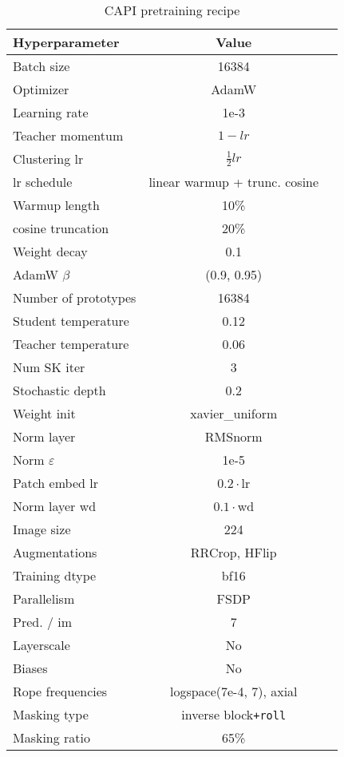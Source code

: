 \begin{table}
\centering
    \begin{tabular}{lcc}
      \toprule
      Hyperparameter & Value \\
      \midrule
      Batch size & 16384 \\
      Optimizer & AdamW \\
      Learning rate & 1e-3 \\
      Teacher momentum & $1-lr$ \\
      Clustering lr & $\frac{1}{2}lr$ \\
      lr schedule & linear warmup + trunc. cosine\\
      Warmup length & 10\% \\
      cosine truncation & 20\% \\
      Weight decay & 0.1 \\
      AdamW $\beta$ & (0.9, 0.95) \\
      Number of prototypes & 16384 \\
      Student temperature & 0.12 \\
      Teacher temperature & 0.06 \\
      Num SK iter & 3 \\
      Stochastic depth & 0.2 \\
      Weight init & xavier\_uniform \\
      Norm layer & RMSnorm \\
      Norm $\varepsilon$ & 1e-5 \\
      Patch embed lr & $0.2\cdot{}$lr \\
      Norm layer wd & $0.1\cdot{}$wd \\
      Image size & 224 \\
      Augmentations & RRCrop, HFlip \\
      Training dtype & bf16 \\
      Parallelism & FSDP \\
      Pred. / im & 7 \\
      Layerscale & No \\
      Biases & No \\
      Rope frequencies & logspace(7e-4, 7), axial \\
      Masking type & inverse block\texttt{+roll} \\
      Masking ratio & 65\% \\
      \bottomrule
    \end{tabular}
    \caption{
      CAPI pretraining recipe
    }
    \label{tab:pretraining_recipe}
\end{table}

